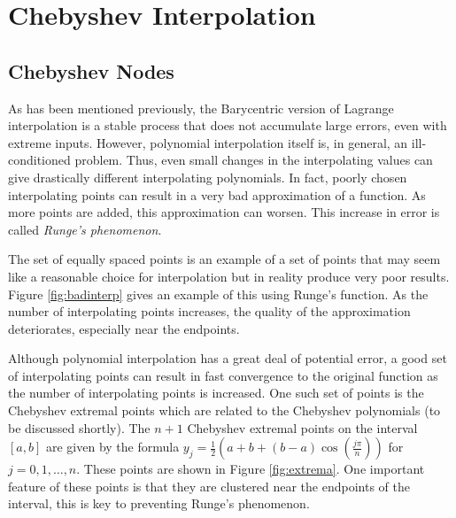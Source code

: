 \section*{Chebyshev Interpolation}
\subsection*{Chebyshev Nodes}
As has been mentioned previously, the Barycentric version of Lagrange interpolation is a stable process that does not accumulate large errors, even with extreme inputs.
However, polynomial interpolation itself is, in general, an ill-conditioned problem.
Thus, even small changes in the interpolating values can give drastically different interpolating polynomials.
In fact, poorly chosen interpolating points can result in a very bad approximation of a function.
As more points are added, this approximation can worsen.
This increase in error is called \emph{Runge's phenomenon}.

The set of equally spaced points is an example of a set of points that may seem like a reasonable choice for interpolation but in reality produce very poor results.
Figure \ref{fig:badinterp} gives an example of this using Runge's function.
As the number of interpolating points increases, the quality of the approximation deteriorates, especially near the endpoints.

Although polynomial interpolation has a great deal of potential error, a good set of interpolating points can result in fast convergence to the original function as the number of interpolating points is increased.
One such set of points is the Chebyshev extremal points which are related to the Chebyshev polynomials (to be discussed shortly).
The $n+1$ Chebyshev extremal points on the interval $[a,b]$ are given by the formula $y_j=\frac{1}{2}(a+b + (b-a)\cos(\frac{j\pi}{n}))$ for $j=0,1,\dots,n$.
These points are shown in Figure \ref{fig:extrema}.
One important feature of these points is that they are clustered near the endpoints of the interval, this is key to preventing Runge's phenomenon.

